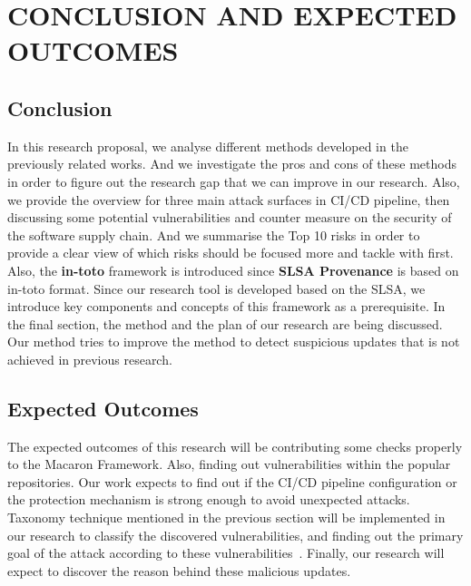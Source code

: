 \section{CONCLUSION AND EXPECTED OUTCOMES}
\subsection{Conclusion}
In this research proposal, we analyse different methods developed in the previously related works.
And we investigate the pros and cons of these methods in order to figure out the research gap that 
we can improve in our research. Also, we provide the overview for three main attack surfaces in CI/CD
pipeline, then discussing some potential vulnerabilities and counter measure on the security of the software
supply chain. And we summarise the Top 10 risks in order to provide a clear view of which risks should
be focused more and tackle with first. 
Also, the \textbf{in-toto} framework is introduced since \textbf{SLSA Provenance} is based on in-toto format.
Since our research tool is developed based on the SLSA, we introduce key components and concepts of this 
framework as a prerequisite.
In the final section, the method and the plan of our research are being discussed. Our method tries to 
improve the method to detect suspicious updates that is not achieved in previous research.
\subsection{Expected Outcomes}
The expected outcomes of this research will be contributing some checks properly to the Macaron 
Framework. Also, finding out vulnerabilities within the popular repositories. Our work expects to 
find out if the CI/CD pipeline configuration or the protection mechanism is strong enough to 
avoid unexpected attacks. Taxonomy technique mentioned in the previous section will be 
implemented in our research to classify the discovered vulnerabilities, and finding out the primary goal of the attack according to these vulnerabilities~\cite{ohm2020backstabber}. Finally, our research will expect to 
discover the reason behind these malicious updates.   